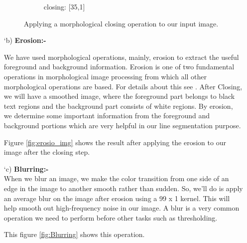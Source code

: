 \begin{itemize}
\begin{figure}[!htb]
\begin{subfigure}[b]{0.4\textwidth}
                 \caption{closing: [35,1]}
                 \label{fig:close2}
             \end{subfigure}
            \caption{Applying a morphological closing operation to our input image.}
            \label{fig:closing}
        \end{figure}

        \item[\char `b)] \textbf{Erosion:-}
        
        We have used morphological operations, mainly, erosion to extract the useful foreground and background information. Erosion is one of two fundamental operations in morphological image processing from which all other morphological operations are based. For details about this see \cite{esosion}. After Closing, we will have a smoothed image, where the foreground part belongs to black text regions and the background part consists of white regions. By erosion, we determine some important information from the foreground and background portions which are very helpful in our line segmentation purpose.
        
        Figure \ref{fig:erosio_img} shows the result after applying the erosion to our image after the closing step.

        \item[\char `c)] \textbf{Blurring:-}\\
        When we blur an image, we make the color transition from one side of an edge in the image to another smooth rather than sudden. So, we’ll do is apply an average blur on the image after erosion  using a 99 x 1 kernel. This will help smooth out high-frequency noise in our image. A blur is a very common operation we need to perform before other tasks such as thresholding.
        
        This figure \ref{fig:Blurring} shows this operation.
        

\end{itemize}
